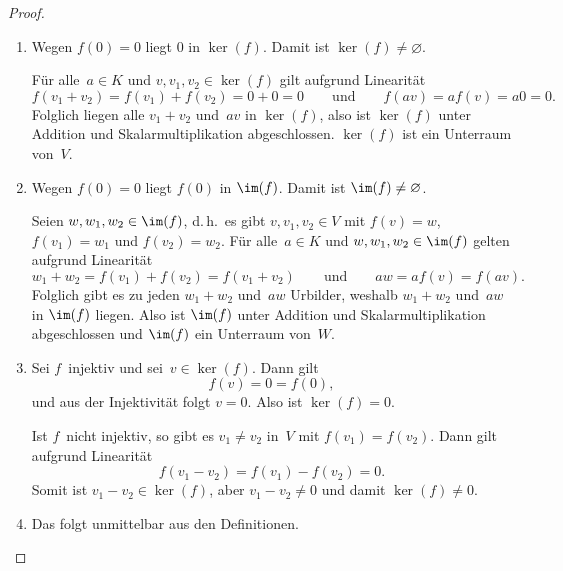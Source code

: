 \documentclass[a4paper]{article}
\begin{document}
\begin{proof}\leavevmode
    \begin{enumerate}
        \item Wegen $f(0) = 0$ liegt $0$ in $\ker(f)$. Damit ist $\ker(f) \neq \varnothing$.

              Für alle~$a \in K$ und $v,v_1,v_2 \in \ker(f)$ gilt aufgrund Linearität
              \begin{equation*}
                  f(v_1+v_2) = f(v_1)+f(v_2) = 0+0 = 0 \qquad\text{und}\qquad f(av) = af(v) = a0 = 0.
              \end{equation*}
              Folglich liegen alle $v_1+v_2$ und~$av$ in $\ker(f)$, also ist $\ker(f)$ unter Addition und Skalarmultiplikation abgeschlossen. $\ker(f)$ ist ein Unterraum von~$V$.
        \item Wegen $f(0) = 0$ liegt $f(0)$ in $\im(f)$. Damit ist $\im(f) \neq \varnothing$.

              Seien $w,w_1,w_2 \in \im(f)$, d.\,h.\ es gibt $v,v_1,v_2 \in V$ mit $f(v) = w$, $f(v_1) = w_1$ und $f(v_2) = w_2$. Für alle~$a \in K$ und $w,w_1,w_2 \in \im(f)$ gelten aufgrund Linearität
              \begin{equation*}
                  w_1+w_2 = f(v_1)+f(v_2) = f(v_1+v_2) \qquad\text{und}\qquad aw = af(v) = f(av).
              \end{equation*}
              Folglich gibt es zu jeden $w_1+w_2$ und~$aw$ Urbilder, weshalb $w_1+w_2$ und~$aw$ in $\im(f)$ liegen. Also ist $\im(f)$ unter Addition und Skalarmultiplikation abgeschlossen und $\im(f)$ ein Unterraum von~$W$.
        \item Sei $f$~injektiv und sei~$v \in \ker(f)$. Dann gilt
              \begin{equation*}
                  f(v) = 0 = f(0),
              \end{equation*}
              und aus der Injektivität folgt $v = 0$. Also ist $\ker(f) = 0$.

              Ist $f$~nicht injektiv, so gibt es $v_1 \neq v_2$ in~$V$ mit $f(v_1) = f(v_2)$. Dann gilt aufgrund Linearität
              \begin{equation*}
                  f(v_1-v_2) = f(v_1)-f(v_2) = 0.
              \end{equation*}
              Somit ist $v_1-v_2 \in \ker(f)$, aber $v_1-v_2 \neq 0$ und damit $\ker(f) \neq 0$.
        \item Das folgt unmittelbar aus den Definitionen.\qedhere
    \end{enumerate}
\end{proof}
\end{document}
